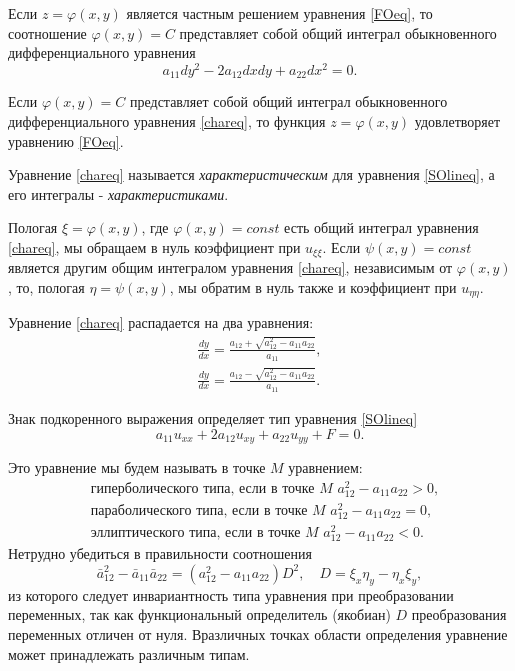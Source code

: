 Если $z = \varphi(x, y)$ является частным решением уравнения \eqref{FOeq}, то соотношение $\varphi(x, y) = C$ представляет собой общий интеграл обыкновенного дифференциального уравнения 
\begin{equation} \label{chareq}
	a_{11} dy^2 - 2 a_{12} dx dy + a_{22} dx^2 = 0.
\end{equation}

Если $\varphi(x, y) = C$ представляет собой общий интеграл обыкновенного дифференциального уравнения \eqref{chareq}, то функция $z = \varphi(x, y)$ удовлетворяет уравнению \eqref{FOeq}. 

Уравнение \eqref{chareq} называется \textit{характеристическим} для уравнения \eqref{SOlineq}, а его интегралы - \textit{характеристиками}. 

Пологая $\xi = \varphi(x, y)$, где $\varphi(x, y) = const$ есть общий интеграл уравнения \eqref{chareq}, мы обращаем в нуль коэффициент при $u_{\xi\xi}$. Если $\psi(x, y) = const$ является другим общим интегралом уравнения \eqref{chareq}, независимым от $\varphi(x, y)$, то, пологая $\eta = \psi(x, y)$, мы обратим в нуль также и коэффициент при $u_{\eta\eta}$. 

Уравнение \eqref{chareq} распадается на два уравнения:
\begin{align}
	\frac{dy}{dx} = \frac{a_{12} + \sqrt{a_{12}^2 - a_{11} a_{22}}}{a_{11}}, \\
	\frac{dy}{dx} = \frac{a_{12} - \sqrt{a_{12}^2 - a_{11} a_{22}}}{a_{11}}.
\end{align}

Знак подкоренного выражения определяет тип уравнения \eqref{SOlineq}
\begin{equation*}
	a_{11} u_{xx} + 2 a_{12} u_{xy} + a_{22} u_{yy} + F = 0.
\end{equation*}

Это уравнение мы будем называть в точке $M$ уравнением:
\begin{align*}
	&\texttt{гиперболического } \text{типа, если в точке } M \, \, a_{12}^2 - a_{11} a_{22} > 0, \\
	&\texttt{параболического } \text{типа, если в точке } M \,\, a_{12}^2 - a_{11} a_{22} = 0, \\
	&\texttt{эллиптического } \text{типа, если в точке } M \,\, a_{12}^2 - a_{11} a_{22} < 0.
\end{align*}
Нетрудно убедиться в правильности соотношения
\begin{equation*}
	\bar{a}_{12}^{2} - \bar{a}_{11} \bar{a}_{22} = (a_{12}^{2} - a_{11} a_{22}) D^2, \quad D = \xi_{x} \eta_{y} - \eta_{x} \xi_{y},
\end{equation*}
из которого следует инвариантность типа уравнения при преобразовании переменных, так как функциональный определитель (якобиан) $D$ преобразования переменных отличен от нуля. Вразличных точках области определения уравнение может принадлежать различным типам. 

